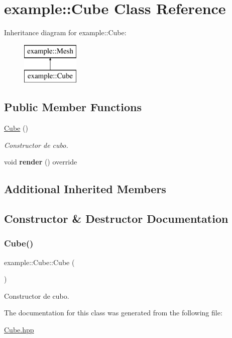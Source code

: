 \hypertarget{classexample_1_1_cube}{}\section{example\+::Cube Class Reference}
\label{classexample_1_1_cube}
Inheritance diagram for example\+::Cube\+:\begin{figure}[H]
\begin{center}
\leavevmode
\includegraphics[height=2.000000cm]{classexample_1_1_cube}
\end{center}
\end{figure}
\subsection*{Public Member Functions}
\begin{DoxyCompactItemize}
\item 
\mbox{\hyperlink{classexample_1_1_cube_a3be7fbbad6d33b8ca68487fea7e20bdf}{Cube}} ()
\begin{DoxyCompactList}\small\item\em Constructor de cubo. \end{DoxyCompactList}\item 
\mbox{\label{classexample_1_1_cube_afdd445b71926b53b996d450a0c2b6023}} 
void {\bfseries render} () override
\end{DoxyCompactItemize}
\subsection*{Additional Inherited Members}


\subsection{Constructor \& Destructor Documentation}
\mbox{\label{classexample_1_1_cube_a3be7fbbad6d33b8ca68487fea7e20bdf}} 
\subsubsection{\texorpdfstring{Cube()}{Cube()}}
{\footnotesize\ttfamily example\+::\+Cube\+::\+Cube (\begin{DoxyParamCaption}{ }\end{DoxyParamCaption})}



Constructor de cubo. 



The documentation for this class was generated from the following file\+:\begin{DoxyCompactItemize}
\item 
\mbox{\hyperlink{_cube_8hpp}{Cube.\+hpp}}\end{DoxyCompactItemize}
